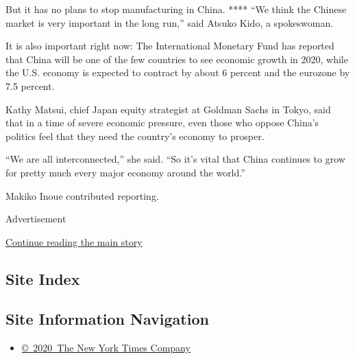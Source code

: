 But it has no plans to stop manufacturing in China. **** ``We think the
Chinese market is very important in the long run,'' said Atsuko Kido, a
spokeswoman.

It is also important right now: The International Monetary Fund has
reported that China will be one of the few countries to see economic
growth in 2020, while the U.S. economy is expected to contract by about
6 percent and the eurozone by 7.5 percent.

Kathy Matsui, chief Japan equity strategist at Goldman Sachs in Tokyo,
said that in a time of severe economic pressure, even those who oppose
China's politics feel that they need the country's economy to prosper.

``We are all interconnected,'' she said. ``So it's vital that China
continues to grow for pretty much every major economy around the
world.''

Makiko Inoue contributed reporting.

Advertisement

\protect\hyperlink{after-bottom}{Continue reading the main story}

\hypertarget{site-index}{%
\subsection{Site Index}\label{site-index}}

\hypertarget{site-information-navigation}{%
\subsection{Site Information
Navigation}\label{site-information-navigation}}

\begin{itemize}
\tightlist
\item
  \href{https://help.nytimes3xbfgragh.onion/hc/en-us/articles/115014792127-Copyright-notice}{©~2020~The
  New York Times Company}
\end{itemize}

